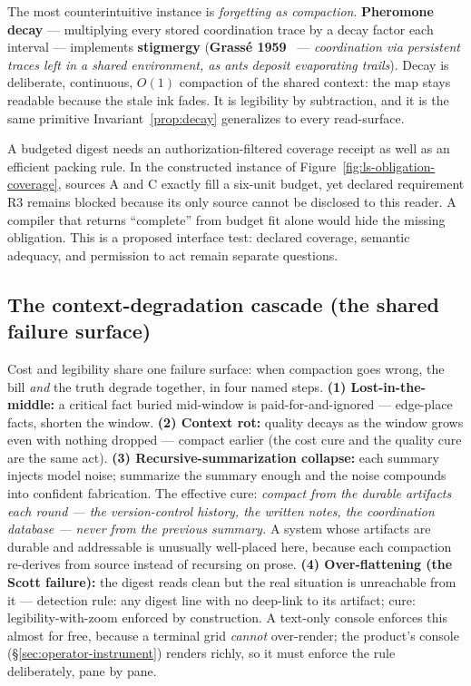 \documentclass[11pt,a4paper]{article}
\theoremstyle{definition}
\theoremstyle{plain}
\begin{document}
The most counterintuitive instance is \emph{forgetting as compaction}.
\textbf{Pheromone decay} --- multiplying every stored coordination trace by a decay
factor each interval --- implements \textbf{stigmergy} (\textbf{Grass\'e
1959}~ --- \emph{coordination via persistent traces left in a shared
environment, as ants deposit evaporating trails}). Decay is deliberate, continuous,
$O(1)$ compaction of the shared context: the map stays readable because the stale ink
fades. It is legibility by subtraction, and it is the same primitive
Invariant~\ref{prop:decay} generalizes to every read-surface.

A budgeted digest needs an authorization-filtered coverage receipt as well as
an efficient packing rule. In the constructed instance of
Figure~\ref{fig:ls-obligation-coverage}, sources A and C exactly fill a
six-unit budget, yet declared requirement R3 remains blocked because its only
source cannot be disclosed to this reader. A compiler that returns ``complete''
from budget fit alone would hide the missing obligation. This is a proposed
interface test: declared coverage, semantic adequacy, and permission to act
remain separate questions.


\subsection{The context-degradation cascade (the shared failure surface)}\label{sec:cascade}

Cost and legibility share one failure surface: when compaction goes wrong, the bill
\emph{and} the truth degrade together, in four named steps. \textbf{(1)
Lost-in-the-middle:} a critical fact buried mid-window is paid-for-and-ignored ---
edge-place facts, shorten the window. \textbf{(2) Context rot:} quality decays as the
window grows even with nothing dropped --- compact earlier (the cost cure and the
quality cure are the same act). \textbf{(3) Recursive-summarization collapse:} each
summary injects model noise; summarize the summary enough and the noise compounds
into confident fabrication. The effective cure: \emph{compact from the durable
artifacts each round --- the version-control history, the written notes, the
coordination database --- never from the previous summary.} A system whose artifacts
are durable and addressable is unusually well-placed here, because each compaction
re-derives from source instead of recursing on prose. \textbf{(4) Over-flattening
(the Scott failure):} the digest reads clean but the real situation is unreachable
from it --- detection rule: any digest line with no deep-link to its artifact; cure:
legibility-with-zoom enforced by construction. A text-only console enforces
this almost for free, because a terminal grid \emph{cannot} over-render; the
product's console (\S\ref{sec:operator-instrument}) renders richly, so it
must enforce the rule deliberately, pane by pane.
\end{document}
